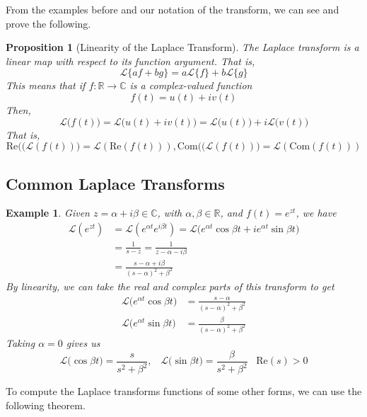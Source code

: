\documentclass{article}
\newtheorem{proposition}[theorem]{Proposition}
\newtheorem{example}{Example}[section]
\theoremstyle{remark}
\theoremstyle{definition}
\begin{document}
  From the examples before and our notation of the transform, we can see and prove the following. 

  \begin{proposition}[Linearity of the Laplace Transform]
  The Laplace transform is a linear map with respect to its function argument. That is, 
  \[\mathcal{L} \{a f + b g\} = a \mathcal{L}\{f\} + b \mathcal{L}\{g\}\]
  This means that if $f: \mathbb{R} \longrightarrow \mathbb{C}$ is a complex-valued function
  \[f(t) = u(t) + i v(t)\]
  Then, 
  \[\mathcal{L}\big(f(t)\big) = \mathcal{L}\big(u(t) + i v(t) \big) = \mathcal{L} \big( u(t) \big) + i \mathcal{L} \big( v(t)\big)\]
  That is, 
  \[\text{Re}\big((\mathcal{L}(f(t))\big) = \mathcal{L}( \text{Re}(f(t))), \text{Com}\big((\mathcal{L}(f(t))\big) = \mathcal{L}( \text{Com}(f(t)))\]
  \end{proposition}


  \subsection{Common Laplace Transforms}

    \begin{example}
    Given $z = \alpha + i \beta \in \mathbb{C}$, with $\alpha, \beta \in \mathbb{R}$, and $f(t) = e^{zt}$, we have
    \begin{align*}
        \mathcal{L} (e^{zt}) & = \mathcal{L} (e^{\alpha t} e^{i \beta t}) = \mathcal{L} \big( e^{\alpha t} \cos{\beta t} + i e^{\alpha t} \sin{\beta t}\big) \\
        & = \frac{1}{s-z} = \frac{1}{z - \alpha - i \beta} \\
        & = \frac{s - \alpha + i \beta}{(s-\alpha)^2 + \beta^2}
    \end{align*}
    By linearity, we can take the real and complex parts of this transform to get
    \begin{align}
        \mathcal{L} \big(e^{\alpha t} \cos{\beta t} \big) & = \frac{s-\alpha}{(s-\alpha)^2 + \beta^2} \\
        \mathcal{L} \big(e^{\alpha t} \sin{\beta t} \big) & = \frac{\beta}{(s-\alpha)^2 + \beta^2}
    \end{align}
    Taking $\alpha = 0$ gives us
    \[\mathcal{L} \big( \cos{\beta t}\big) = \frac{s}{s^2 + \beta^2}, \;\;\; \mathcal{L}\big( \sin{\beta t}\big) = \frac{\beta}{s^2 + \beta^2} \;\;\; \text{Re}(s) > 0\]
    \end{example}

    To compute the Laplace transforms functions of some other forms, we can use the following theorem. 
\end{document}
